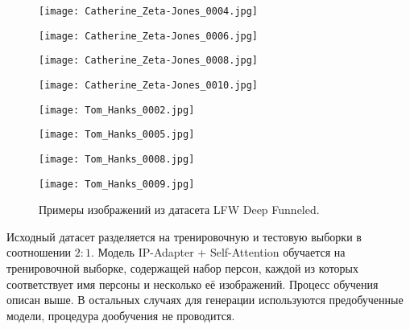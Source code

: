 \documentclass{article}
\begin{document}
\begin{figure}[H]
\begin{minipage}{.25\textwidth}
    \centering
    \texttt{[image: Catherine\_Zeta-Jones\_0004.jpg]}
    \label{fig:1}
\end{minipage}%
\begin{minipage}{.25\textwidth}
    \centering
    \texttt{[image: Catherine\_Zeta-Jones\_0006.jpg]}
    \label{fig:2}
\end{minipage}%
\begin{minipage}{.25\textwidth}
    \centering
    \texttt{[image: Catherine\_Zeta-Jones\_0008.jpg]}
    \label{fig:3}
\end{minipage}%
\begin{minipage}{.25\textwidth}
    \centering
    \texttt{[image: Catherine\_Zeta-Jones\_0010.jpg]}
    \label{fig:4}
\end{minipage}%
\vspace{-12pt}
\begin{minipage}{.25\textwidth}
    \centering
    \texttt{[image: Tom\_Hanks\_0002.jpg]}
    \label{fig:11}
\end{minipage}%
\begin{minipage}{.25\textwidth}
    \centering
    \texttt{[image: Tom\_Hanks\_0005.jpg]}
    \label{fig:21}
\end{minipage}%
\begin{minipage}{.25\textwidth}
    \centering
    \texttt{[image: Tom\_Hanks\_0008.jpg]}
    \label{fig:31}
\end{minipage}%
\begin{minipage}{.25\textwidth}
    \centering
    \texttt{[image: Tom\_Hanks\_0009.jpg]}
    \label{fig:41}
\end{minipage}%
\caption{Примеры изображений из датасета LFW Deep Funneled.}
\end{figure}

Исходный датасет разделяется на тренировочную и тестовую выборки в соотношении $2:1$. Модель IP-Adapter + Self-Attention обучается на тренировочной выборке, содержащей набор персон, каждой из которых соответствует имя персоны и несколько её изображений.  Процесс обучения описан выше. В остальных случаях для генерации используются предобученные модели, процедура дообучения не проводится. 
\end{document}
